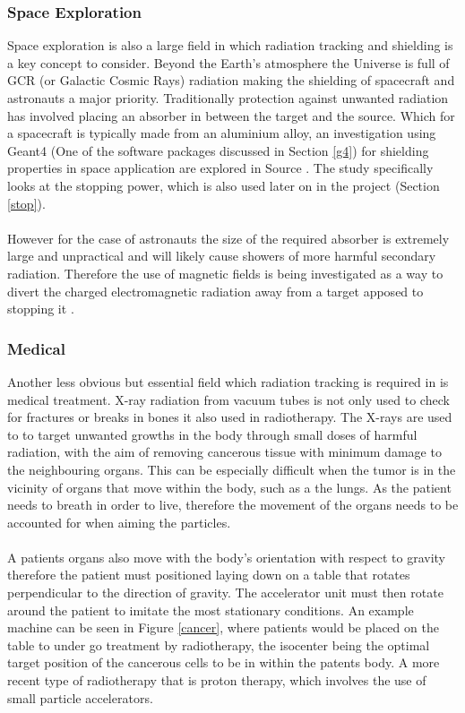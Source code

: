 \documentclass[12pt,a4paper]{article}
\begin{document}
\newpage
\subsubsection{Space Exploration}
\noindent Space exploration is also a large field in which radiation tracking and shielding is a key concept to consider. Beyond the Earth's atmosphere the Universe is full of GCR (or Galactic Cosmic Rays) radiation making the shielding of spacecraft and astronauts a major priority. Traditionally protection against unwanted radiation has involved placing an absorber in between the target and the source. Which for a spacecraft is typically made from an aluminium alloy, an investigation using Geant4 (One of the software packages discussed in Section \ref{g4}) for shielding properties in space application are explored in Source \cite{spacesh}. The study specifically looks at the stopping power, which is also used later on in the project (Section \ref{stop}). 
\\\\
\noindent However for the case of astronauts the size of the required absorber is extremely large and unpractical and will likely cause showers of more harmful secondary radiation. Therefore the use of magnetic fields is being investigated as a way to divert the charged electromagnetic radiation away from a target apposed to stopping it \cite{magf}. 


\subsubsection{Medical}
\noindent Another less obvious but essential field which radiation tracking is required in is medical treatment. X-ray radiation from vacuum tubes is not only used to check for fractures or breaks in bones it also used in radiotherapy. The X-rays are used to to target unwanted growths in the body through small doses of harmful radiation, with the aim of removing cancerous tissue with minimum damage to the neighbouring organs. This can be especially difficult when the tumor is in the vicinity of organs that move within the body, such as a the lungs. As the patient needs to breath in order to live, therefore the movement of the organs needs to be accounted for when aiming the particles.
\\\\
\noindent A patients organs also move with the body's orientation with respect to gravity therefore the patient must positioned laying down on a table that rotates perpendicular to the direction of gravity. The accelerator unit must then rotate around the patient to imitate the most stationary conditions. An example machine can be seen in Figure \ref{cancer}, where patients would be placed on the table to under go treatment by radiotherapy, the isocenter being the optimal target position of the cancerous cells to be in within the patents body.  A more recent type of radiotherapy that is proton therapy, which involves the use of small particle accelerators.
\end{document}
